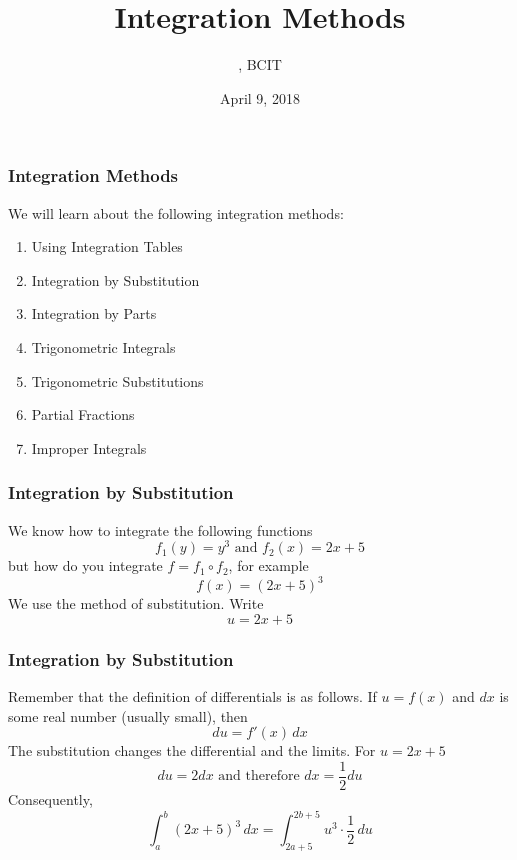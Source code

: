 \documentclass[xcolor=dvipsnames]{beamer}
\title{Integration Methods}
\subtitle{{\CourseNumber}, BCIT}
\author{\CourseName}
\date{April 9, 2018}
\begin{document}
\begin{frame}
  \titlepage
\end{frame}

\begin{frame}
  \frametitle{Integration Methods}
  We will learn about the following integration methods:
  \begin{enumerate}
  \item Using Integration Tables
  \item Integration by Substitution
  \item Integration by Parts
  \item Trigonometric Integrals
  \item Trigonometric Substitutions
  \item Partial Fractions
  \item Improper Integrals
  \end{enumerate}
\end{frame}

\begin{frame}
  \frametitle{Integration by Substitution}
We know how to integrate the following functions
\begin{equation}
  \label{eq:deixugha}
  f_{1}(y)=y^{3}\mbox{ and }f_{2}(x)=2x+5
\end{equation}
but how do you integrate $f=f_{1}\circ{}f_{2}$, for example
\begin{equation}
  \label{eq:eetusiil}
  f(x)=(2x+5)^{3}
\end{equation}
We use the method of \alert{substitution}. Write 
\begin{equation}
  \label{eq:ohshaoxe}
  u=2x+5
\end{equation}
\end{frame}

\begin{frame}
  \frametitle{Integration by Substitution}
Remember that the definition of differentials is as follows. If
$u=f(x)$ and $dx$ is some real number (usually small), then 
\begin{equation}
  \label{eq:eevieweo}
  du=f'(x)\,dx
\end{equation}
The substitution changes \alert{the differential and the limits}. For
$u=2x+5$
\begin{equation}
  \label{eq:ushooxiu}
  du=2dx\mbox{ and therefore }dx=\frac{1}{2}du
\end{equation}
Consequently,
\begin{equation}
  \label{eq:olaihaxi}
  \int_{a}^{b}(2x+5)^{3}\,dx=\int_{2a+5}^{2b+5}u^{3}\cdot{}\frac{1}{2}\,du
\end{equation}
\end{frame}
\end{document}

